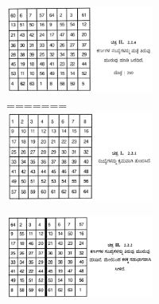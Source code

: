 \begin{figure}[H]
\begin{figure}[H]
\begin{figure}[h]
\begin{itemize}
\begin{figure}[H]
	\end{figure}
	\begin{figure}[H]
	\includegraphics[scale=.92]{src/figures/chap3/fig3-23.jpg}
=======
	\includegraphics[scale=.8]{src/figures/chap3/fig3.20.jpg}
	\end{figure}
	\begin{figure}[H]
	\includegraphics[scale=.8]{src/figures/chap3/fig3.21.jpg}

\end{figure}
\end{itemize}
\end{figure}
\end{figure}
\end{figure}
